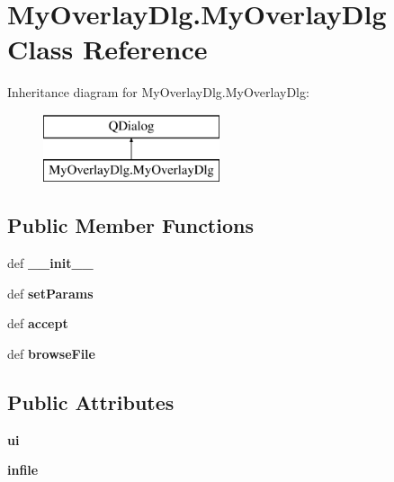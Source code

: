 \hypertarget{classMyOverlayDlg_1_1MyOverlayDlg}{\section{My\-Overlay\-Dlg.\-My\-Overlay\-Dlg Class Reference}
\label{classMyOverlayDlg_1_1MyOverlayDlg}
}
Inheritance diagram for My\-Overlay\-Dlg.\-My\-Overlay\-Dlg\-:\begin{figure}[H]
\begin{center}
\leavevmode
\includegraphics[height=2.000000cm]{classMyOverlayDlg_1_1MyOverlayDlg}
\end{center}
\end{figure}
\subsection*{Public Member Functions}
\begin{DoxyCompactItemize}
\item 
\hypertarget{classMyOverlayDlg_1_1MyOverlayDlg_a836f26cd68556b2b577ba8ebbc36892a}{def {\bfseries \-\_\-\-\_\-init\-\_\-\-\_\-}}\label{classMyOverlayDlg_1_1MyOverlayDlg_a836f26cd68556b2b577ba8ebbc36892a}

\item 
\hypertarget{classMyOverlayDlg_1_1MyOverlayDlg_a30489fcaa881f5dccddcc4782a1fcb2e}{def {\bfseries set\-Params}}\label{classMyOverlayDlg_1_1MyOverlayDlg_a30489fcaa881f5dccddcc4782a1fcb2e}

\item 
\hypertarget{classMyOverlayDlg_1_1MyOverlayDlg_a911fbf22d0431f251fedbc1cc9ceee34}{def {\bfseries accept}}\label{classMyOverlayDlg_1_1MyOverlayDlg_a911fbf22d0431f251fedbc1cc9ceee34}

\item 
\hypertarget{classMyOverlayDlg_1_1MyOverlayDlg_a6b58d65c0fb4398f5187d9636723d4fd}{def {\bfseries browse\-File}}\label{classMyOverlayDlg_1_1MyOverlayDlg_a6b58d65c0fb4398f5187d9636723d4fd}

\end{DoxyCompactItemize}
\subsection*{Public Attributes}
\begin{DoxyCompactItemize}
\item 
\hypertarget{classMyOverlayDlg_1_1MyOverlayDlg_a7d657b769e24e56ee48781d352de441e}{{\bfseries ui}}\label{classMyOverlayDlg_1_1MyOverlayDlg_a7d657b769e24e56ee48781d352de441e}

\item 
\hypertarget{classMyOverlayDlg_1_1MyOverlayDlg_acca8e0275695cf61524525634591381b}{{\bfseries infile}}\label{classMyOverlayDlg_1_1MyOverlayDlg_acca8e0275695cf61524525634591381b}

\end{DoxyCompactItemize}
